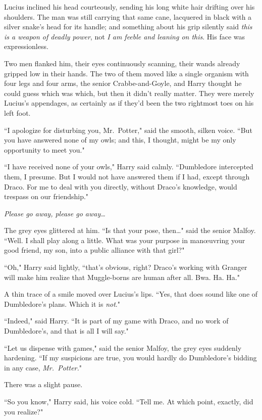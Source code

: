 Lucius inclined his head courteously, sending his long white hair drifting over his shoulders. The man was still carrying that same cane, lacquered in black with a silver snake's head for its handle; and something about his grip silently said \emph{this is a weapon of deadly power}, not \emph{I am feeble and leaning on this}. His face was expressionless.

Two men flanked him, their eyes continuously scanning, their wands already gripped low in their hands. The two of them moved like a single organism with four legs and four arms, the senior Crabbe-and-Goyle, and Harry thought he could guess which was which, but then it didn't really matter. They were merely Lucius's appendages, as certainly as if they'd been the two rightmost toes on his left foot.

``I apologize for disturbing you, Mr.~Potter," said the smooth, silken voice. ``But you have answered none of my owls; and this, I thought, might be my only opportunity to meet you."

``I have received none of your owls," Harry said calmly. ``Dumbledore intercepted them, I presume. But I would not have answered them if I had, except through Draco. For me to deal with you directly, without Draco's knowledge, would trespass on our friendship."

\emph{Please go away, please go away{\ldots}}

The grey eyes glittered at him. ``Is that your pose, then{\ldots}" said the senior Malfoy. ``Well. I shall play along a little. What was your purpose in manœuvring your good friend, my son, into a public alliance with that girl?"

``Oh," Harry said lightly, ``that's obvious, right? Draco's working with Granger will make him realize that Muggle-borns are human after all. Bwa. Ha. Ha."

A thin trace of a smile moved over Lucius's lips. ``Yes, that does sound like one of Dumbledore's plans. Which it is \emph{not}."

``Indeed," said Harry. ``It is part of my game with Draco, and no work of Dumbledore's, and that is all I will say."

``Let us dispense with games," said the senior Malfoy, the grey eyes suddenly hardening. ``If my suspicions are true, you would hardly do Dumbledore's bidding in any case, \emph{Mr.~Potter.}"

There was a slight pause.

``So you know," Harry said, his voice cold. ``Tell me. At which point, exactly, did you realize?"

